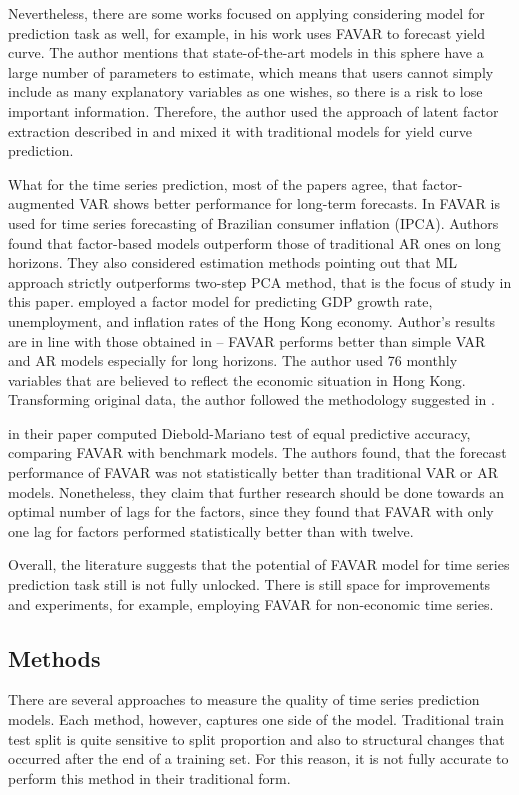 \documentclass[a4paper, 14pt]{article}
\begin{document}
Nevertheless, there are some works focused on applying considering model for prediction task as well, for example,  \cite{monch2008forecasting} in his work uses FAVAR to forecast yield curve. The author mentions that state-of-the-art models in this sphere have a large number of parameters to estimate, which means that users cannot simply include as many explanatory variables as one wishes, so there is a risk to lose important information. Therefore, the author used the approach of latent factor extraction described in \cite{bernanke2005measuring} and mixed it with traditional models for yield curve prediction. 

What for the time series prediction, most of the papers agree, that factor-augmented VAR shows better performance for long-term forecasts. In \cite{figueiredo2013forecasting} FAVAR is used for time series forecasting of Brazilian consumer inflation (IPCA). Authors found that factor-based models outperform those of traditional AR ones on long horizons. They also considered estimation methods pointing out that ML approach strictly outperforms two-step PCA method, that is the focus of study in this paper. \cite{pang2010forecasting} employed a factor model for predicting GDP growth rate, unemployment, and inflation rates of the Hong Kong economy. Author's results are in line with those obtained in \cite{figueiredo2013forecasting} -- FAVAR performs better than simple VAR and AR models especially for long horizons. The author used 76 monthly variables that are believed to reflect the economic situation in Hong Kong. Transforming original data, the author followed the methodology suggested in \cite{stock2005implications}.

\cite{berggren2016can} in their paper computed Diebold-Mariano test of equal predictive accuracy, comparing FAVAR with benchmark models. The authors found, that the forecast performance of FAVAR was not statistically better than traditional VAR or AR models. Nonetheless, they claim that further research should be done towards an optimal number of lags for the factors, since they found that FAVAR with only one lag for factors performed statistically better than with twelve.  

Overall, the literature suggests that the potential of FAVAR model for time series prediction task still is not fully unlocked. There is still space for improvements and experiments, for example, employing FAVAR for non-economic time series.

\subsection{Methods}
There are several approaches to measure the quality of time series prediction models. Each method, however, captures one side of the model. Traditional train test split is quite sensitive to split proportion and also to structural changes that occurred after the end of a training set. For this reason, it is not fully accurate to perform this method in their traditional form. 
\end{document}
